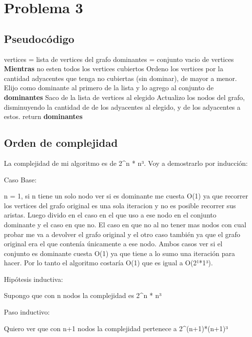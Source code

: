 \section{Problema 3}

\subsection{Pseudocódigo}

\begin{codebox}
\li	vertices = lista de vertices del grafo
\li	dominantes = conjunto vacio de vertices
\li	\textbf{Mientras} no esten todos los vertices cubiertos \Do
\li 		Ordeno los vertices por la cantidad adyacentes que tenga no cubiertas (sin dominar), de mayor a menor.
\li 		Elijo como dominante al primero de la lista y lo agrego al conjunto de \textbf{dominantes}
\li 		Saco de la lista de vertices al elegido
\li 		Actualizo los nodos del grafo, disminuyendo la cantidad de  de los adyacentes al elegido, y de los adyacentes a estos.
	\End
\li	return \textbf{dominantes}
\end{codebox}

\subsection{Orden de complejidad}

La complejidad de mi algoritmo es de 2^n * n³. Voy a demostrarlo por inducción:

Caso Base:

n = 1, si n tiene un solo nodo ver si es dominante me cuesta O(1) ya que recorrer los vertices del grafo original es una sola iteracion y no es posible recorrer sus aristas. Luego divido en el caso en el que uso a ese nodo en el conjunto dominante y el caso en que no. El caso en que no al no tener mas nodos con cual probar me va a devolver el grafo original y el otro caso también ya que el grafo original era el que contenía únicamente a ese nodo. Ambos casos ver si el conjunto es dominante cuesta O(1) ya que tiene a lo sumo una iteración para hacer. Por lo tanto el algoritmo costaría O(1) que es igual a O(2¹*1³).

Hipótesis inductiva:

Supongo que con n nodos la complejidad es 2^n * n³

Paso inductivo:

Quiero ver que con n+1 nodos la complejidad pertenece a 2^(n+1)*(n+1)³

